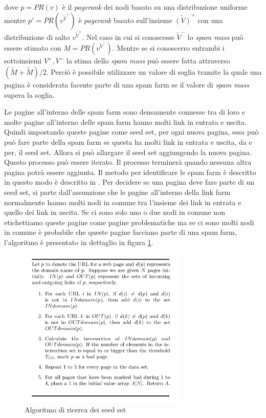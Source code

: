 dove \(p=PR(v)\) è il \textit{pagerank} dei nodi basato su una distribuzione uniforme mentre \(p'=PR(v^{\tilde{V}^+})\) è \textit{pagerank} basato sull'insieme \(\tilde{(V)}^+\)  con una distribuzione di salto \(v^{\tilde{V}^+}\). Nel caso in cui si conoscesse \(\tilde{V}^-\) lo \textit{spam mass} può essere stimato con \(M=PR(v^{\tilde{V}^-})\). Mentre se si conoscerro entrambi i sottoinsiemi \(V^+, V^-\) la stima dello \textit{spam mass} può essere fatta attraverso \((\tilde{M}+\tilde{M})/2\). Perciò è possibile utilizzare un valore di soglia tramite la quale una pagina è considerata facente parte di una spam farm se il valore di \textit{spam mass} supera la soglia.

Le pagine all'interno delle spam farm sono densamente connesse tra di loro e molte pagine all'interno delle spam farm hanno molti link in entrata e uscita. Quindi  impostando queste pagine come seed set, per ogni nuova pagina, essa può può fare parte della spam farm se questa ha molti link in entrata e uscita, da e per, il seed set. Allora si può allargare il seed set aggiungendo la nuova pagina. Questo processo può essere iterato. Il processo terminerà quando nessuna altra pagina potrà essere aggiunta. Il metodo per identificare le spam farm è descritto in questo modo è descritto in \cite{Wu05identifyinglink}. Per decidere se una pagina deve fare parte di un seed set, si parte dall'assunzione che le pagine all'interno della link farm normalmente hanno molti nodi in comune tra l'insieme dei link in entrata e quello dei link in uscita. Se ci sono solo uno o due nodi in comune non etichettiamo queste pagine come pagine problematiche ma se ci sono molti nodi in comune è probabile che queste pagine facciano 
parte di una spam farm, l'algoritmo è presentato in dettaglio in figura \ref{fig:linkfarm1}. 
\begin{figure}
\centering
\includegraphics[width=8cm]{immagini/linkfarm/immagine1.png}
\caption{Algoritmo di ricerca dei seed set}
\label{fig:linkfarm1}
\end{figure}
